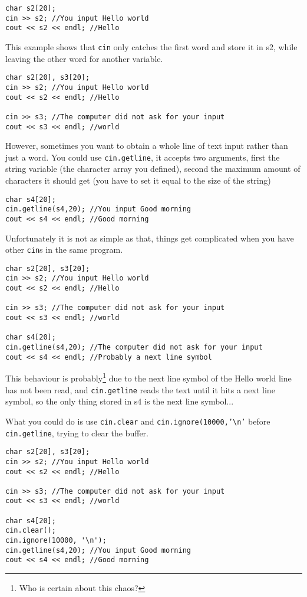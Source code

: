 \begin{lstlisting}
char s2[20];
cin >> s2; //You input Hello world
cout << s2 << endl; //Hello
\end{lstlisting}

This example shows that \texttt{cin} only catches the first word and store it in s2, while leaving the other word for another variable.

\begin{lstlisting}
char s2[20], s3[20];
cin >> s2; //You input Hello world
cout << s2 << endl; //Hello

cin >> s3; //The computer did not ask for your input
cout << s3 << endl; //world
\end{lstlisting}

However, sometimes you want to obtain a whole line of text input rather than just a word. You could use \texttt{cin.getline}, it accepts two arguments, first the string variable (the character array you defined), second the maximum amount of characters it should get (you have to set it equal to the size of the string)

\begin{lstlisting}
char s4[20];
cin.getline(s4,20); //You input Good morning
cout << s4 << endl; //Good morning
\end{lstlisting}

Unfortunately it is not as simple as that, things get complicated when you have other \texttt{cin}s in the same program.

\begin{lstlisting}
char s2[20], s3[20];
cin >> s2; //You input Hello world
cout << s2 << endl; //Hello

cin >> s3; //The computer did not ask for your input
cout << s3 << endl; //world

char s4[20];
cin.getline(s4,20); //The computer did not ask for your input
cout << s4 << endl; //Probably a next line symbol
\end{lstlisting}

This behaviour is probably\footnote{Who is certain about this chaos?} due to the next line symbol of the Hello world line has not been read, and \texttt{cin.getline} reads the text until it hits a next line symbol, so the only thing stored in s4 is the next line symbol...

What you could do is use \texttt{cin.clear} and \texttt{cin.ignore(10000,'\textbackslash n'} before \texttt{cin.getline}, trying to clear the buffer.

\begin{lstlisting}
char s2[20], s3[20];
cin >> s2; //You input Hello world
cout << s2 << endl; //Hello

cin >> s3; //The computer did not ask for your input
cout << s3 << endl; //world

char s4[20];
cin.clear();
cin.ignore(10000, '\n');
cin.getline(s4,20); //You input Good morning
cout << s4 << endl; //Good morning
\end{lstlisting}

